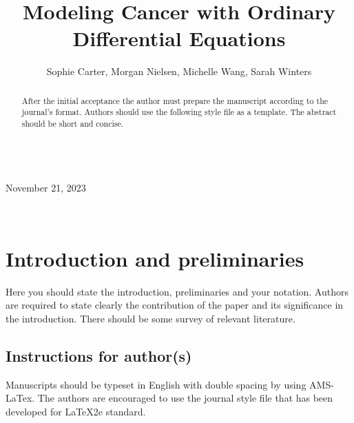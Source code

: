 \documentclass[12pt, reqno]{amsart}
\theoremstyle{definition}
\theoremstyle{remark}
\numberwithin{equation}{section}
\begin{document}
\setcounter{page}{1}


\hfill     \\
{\small November 21, 2023}\hfill  



\centerline{}

\centerline{}

\title[Short Title]{Modeling Cancer with Ordinary Differential Equations}

\author[S. Carter, M. Nielsen, M. Wang, S. Winters]{Sophie Carter, Morgan Nielsen, Michelle Wang, Sarah Winters}

\



\begin{abstract}
After the initial acceptance the author must prepare the manuscript according to the journal's format. Authors should use the following style file as a template. The abstract should be short and concise.
\end{abstract} \maketitle

\section{Introduction and preliminaries}

\noindent Here you should state the introduction, preliminaries and
your notation. Authors are required to state clearly the
contribution of the paper and its significance in the introduction.
There should be some survey of relevant literature.

\subsection{Instructions for author(s)}

Manuscripts should be typeset in English with double spacing by
using AMS-LaTex. The authors are encouraged to use the journal style
file that has been developed for LaTeX2e standard.
\end{document}
